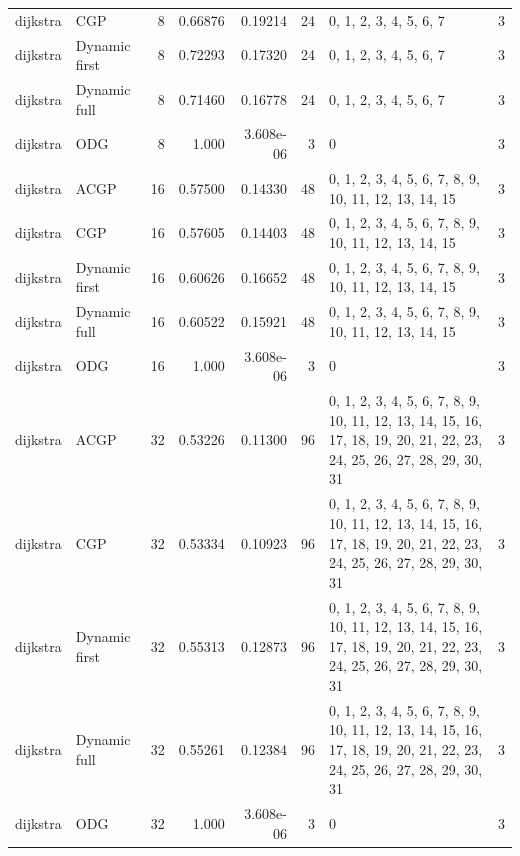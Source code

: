 \documentclass[10pt,a4paper]{article}
\begin{document}
\begin{longtable}{@{}p{23mm}p{29mm}rrrrp{36mm}r@{}}
dijkstra & CGP & 8 & 0.66876 & 0.19214 & 24 & 0, 1, 2, 3, 4, 5, 6, 7 & 3 \\
dijkstra & Dynamic first & 8 & 0.72293 & 0.17320 & 24 & 0, 1, 2, 3, 4, 5, 6, 7 & 3 \\
dijkstra & Dynamic full & 8 & 0.71460 & 0.16778 & 24 & 0, 1, 2, 3, 4, 5, 6, 7 & 3 \\
dijkstra & ODG & 8 & 1.000 & 3.608e-06 & 3 & 0 & 3 \\
dijkstra & ACGP & 16 & 0.57500 & 0.14330 & 48 & 0, 1, 2, 3, 4, 5, 6, 7, 8, 9, 10, 11, 12, 13, 14, 15 & 3 \\
dijkstra & CGP & 16 & 0.57605 & 0.14403 & 48 & 0, 1, 2, 3, 4, 5, 6, 7, 8, 9, 10, 11, 12, 13, 14, 15 & 3 \\
dijkstra & Dynamic first & 16 & 0.60626 & 0.16652 & 48 & 0, 1, 2, 3, 4, 5, 6, 7, 8, 9, 10, 11, 12, 13, 14, 15 & 3 \\
dijkstra & Dynamic full & 16 & 0.60522 & 0.15921 & 48 & 0, 1, 2, 3, 4, 5, 6, 7, 8, 9, 10, 11, 12, 13, 14, 15 & 3 \\
dijkstra & ODG & 16 & 1.000 & 3.608e-06 & 3 & 0 & 3 \\
dijkstra & ACGP & 32 & 0.53226 & 0.11300 & 96 & 0, 1, 2, 3, 4, 5, 6, 7, 8, 9, 10, 11, 12, 13, 14, 15, 16, 17, 18, 19, 20, 21, 22, 23, 24, 25, 26, 27, 28, 29, 30, 31 & 3 \\
dijkstra & CGP & 32 & 0.53334 & 0.10923 & 96 & 0, 1, 2, 3, 4, 5, 6, 7, 8, 9, 10, 11, 12, 13, 14, 15, 16, 17, 18, 19, 20, 21, 22, 23, 24, 25, 26, 27, 28, 29, 30, 31 & 3 \\
dijkstra & Dynamic first & 32 & 0.55313 & 0.12873 & 96 & 0, 1, 2, 3, 4, 5, 6, 7, 8, 9, 10, 11, 12, 13, 14, 15, 16, 17, 18, 19, 20, 21, 22, 23, 24, 25, 26, 27, 28, 29, 30, 31 & 3 \\
dijkstra & Dynamic full & 32 & 0.55261 & 0.12384 & 96 & 0, 1, 2, 3, 4, 5, 6, 7, 8, 9, 10, 11, 12, 13, 14, 15, 16, 17, 18, 19, 20, 21, 22, 23, 24, 25, 26, 27, 28, 29, 30, 31 & 3 \\
dijkstra & ODG & 32 & 1.000 & 3.608e-06 & 3 & 0 & 3 \\
\end{longtable}\normalsize\setlength{\tabcolsep}{6pt}
\clearpage
\end{document}

